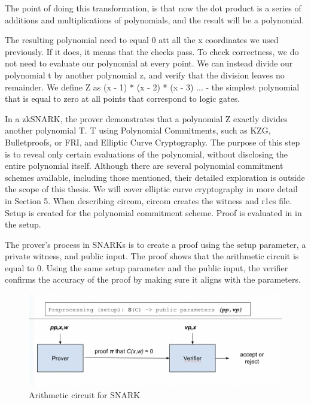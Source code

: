 The point of doing this transformation, is that now the dot product is a series of additions and multiplications of polynomials, and the result will be a polynomial.

The resulting polynomial need to equal 0 att all the x coordinates we used previously.
If it does, it means that the checks pass.
To check correctness, we do not need to evaluate our polynomial at every point. 
We can instead divide our polynomial t by another polynomial z, and verify that the division leaves no remainder.
We define Z as (x - 1) * (x - 2) * (x - 3) ... - the simplest polynomial that is equal to zero at all points that correspond to logic gates. 

In a zkSNARK, the prover demonstrates that a polynomial Z exactly divides another polynomial T.
T using Polynomial Commitments, such as KZG, Bulletproofs, or FRI, and Elliptic Curve Cryptography. 
The purpose of this step is to reveal only certain evaluations of the polynomial, without disclosing the entire polynomial itself. 
Although there are several polynomial commitment schemes available, including those mentioned, their detailed exploration is outside the scope of this thesis. 
We will cover elliptic curve cryptography in more detail in Section 5.
   \iffalse
   When describing circom, circom creates the witness and r1cs file.
   Setup is created for the polynomial commitment scheme. Proof is evaluated in in the setup.

The prover's process in SNARKs is to create a proof using the setup parameter, a private witness, and public input. The proof shows that the arithmetic circuit is equal to 0.
Using the same setup parameter and the public input, the verifier confirms the accuracy of the proof by making sure it aligns with the parameters.

\begin{figure}[H]
   \centering
   \includegraphics[width=130mm]{Circuit.png}
   \caption{Arithmetic circuit for SNARK \cite{ZKM2}}
   \label{overflow}
   \end{figure}


